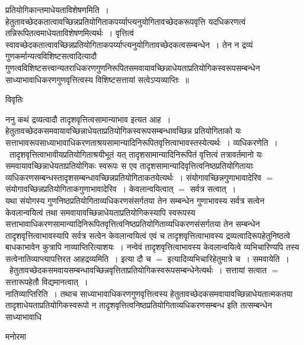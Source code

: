 \documentclass[10pt, openany]{book}
\begin{document}
{{\la प्रतियोगिकान्तमाधेयताविशेषणमिति~।}हेतुतावच्छेदकतात्वावच्छिन्नप्रतियोगिताकपर्य्याप्त्यनुयोगितावच्छेदकरूपवृत्ति यदधिकरणत्वं तन्निरूपितत्वमाधेयताविशेषणमित्यर्थः~। वृत्तित्वं स्वावच्छेदकतात्वावच्छिन्नप्रतियोगिताकपर्य्याप्त्यनुयोगितावच्छेदकत्वसम्बन्धेन~। तेन न द्रव्यं गुणकर्मान्यत्वविशिष्टसत्वादित्यादौ गुणत्वविशिष्टसत्त्वान्यतराधिकरणगुणनिरूपितसमवायावच्छिन्नाधेयताप्रतियोगिकस्वरूपसम्बन्धेन साध्याभावाधिकरणगुणवृत्तित्वस्य विशिष्टसत्तायां सत्वेऽप्यव्याप्तिः~॥
\newpage
\begin{center}     विवृतिः \end{center}

ननु कथं द्रव्यत्वादौ तादृशवृत्तित्वसामान्याभाव इत्यत आह~। हेतुतावच्छेदकसमवायावच्छिन्नाधेयताप्रतियोगिकस्वरूपसम्बन्धावच्छिन्न प्रतियोगिताको यः सत्ताभावरूपसाध्याभावाधिकरणताश्रयसामान्यादिनिरूपितवृत्तित्वाभावस्तस्येत्यर्थः~। {\qt व्यधिकरणेति~}।~तादृशवृत्तित्वाभावीयप्रतियोगिताश्रयीभूतं यत्
तादृशसामान्यादिनिरूपितं वृत्तित्वं तत्रावर्तमानो यः समवायावच्छिन्नाधेयताप्रतियोगिकः स्वरूपः स एव तादृशसामान्यादिवृत्तित्वनिष्ठप्रतियोगितायाः
व्यधिकरणसम्बन्धस्तादृशसम्बन्धावच्छिन्नप्रतियोगिताकतयेत्यर्थः~। संयोगावच्छिन्नगुणाभावादेरिव $=$ संयोगावच्छिन्नप्रतियोगिताकगुणाभावादेरिव~। केवलान्वयित्वात् $=$ सर्वत्र सत्वात्~।\\

यथा संयोगस्य गुणनिष्ठप्रतियोगिताव्यधिकरणसंसर्गतया तेन सम्बन्धेन गुणाभावस्य सर्वत्र सत्वेन केवलान्वयित्वं तथा समवायावच्छिन्नाधेयताप्रतियोगिकस्यापि स्वरूपस्य
सत्ताभावाधिकरणसामान्यादिनिरूपितवृत्तित्वनिष्ठप्रतियोगिताव्यधिकरणसंसर्गतया तेन सम्बन्धेन तादृशवृत्तित्वाभावस्यापि सर्वत्र सत्वेन केवलान्वयित्वं एवं च तादृशवृत्तित्वाभावस्य द्रव्यत्वादिरूपहेतुनिष्ठत्वे बाधकाभावेन कुत्रापि नाव्याप्तिरित्याशयः~। नन्वेवं तादृशवृत्तित्वाभावस्य केवलान्वयित्वे व्यभिचारिण्यपि तस्य सत्वेनातिव्याप्त्यापत्तिरत आह\textendash  द्रव्यमिति~। इत्या दौ च $=$ इत्यादिव्यभिचारिहेतुमात्रे च~। {\qt समवायेति~।}~हेतुतावच्छेदकसमवायसम्बन्धावच्छिन्नवृत्तिताप्रतियोगिकस्वरूपसम्बन्धेनेत्यर्थः~। सत्तायां सत्वात $=$ सत्तारूपहेतौ विद्यमानत्वात्~।\\

{\la नातिव्याप्तिरिति~।} तथाच साध्याभावाधिकरणगुणवृत्तित्वस्य हेतुतावच्छेदकसमवायावच्छिन्नाधेयतात्मकतया  तादृशाधेयताप्रतियोगिकस्वरूपो न
तादृशवृत्तित्वनिष्ठप्रतियोगिताव्यधिकरणसम्बन्ध इति तत्सम्बन्धेन साध्याभावाधि
\begin{center}    मनोरमा \end{center}

}
\end{document}
